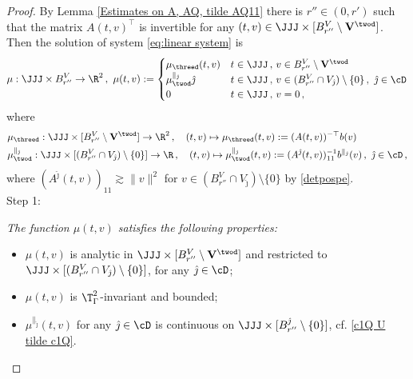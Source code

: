 \documentclass[11pt,a4paper,reqno]{article}
\numberwithin{equation}{section}
\theoremstyle{definition}
\begin{document}
    \begin{proof}
    By Lemma \ref{Estimates on A, AQ, tilde AQ11} there is $r''\in (0,r')$ such that 
  the matrix $A(t,v)^\top$ is invertible for any $(t,v)\in \JJJ\times [B_{r''}^V\setminus{\bf V}^{\twod}]$.
    Then the solution of system 
    \eqref{eq:linear system} is 
\begin{equation}\label{def:mu}
\mu:\JJJ\times B_{r''}^V\to \R^2 \, , 
\ 
            \mu(t,v):=\begin{cases}
                \mu_{\threed}(t,v) & t \in \JJJ \, , \, v\in B_{r''}^V\setminus {\bf V}^{\twod}\\
                \mu_{\twod}^{\parallel_{\hat \jmath}}\hat\jmath & t \in \JJJ \, , \, v\in (B_{r''}^V\cap V_{\hat \jmath})\setminus\{0\} \, , \ {\hat \jmath} \in \cD \\
                0 & t \in \JJJ \, , \, v=0\, , 
            \end{cases} 
        \end{equation}
where 
        \begin{align}\label{defmu3}
     &    \mu_{\threed} : \JJJ\times [B_{r''}^V\setminus {\bf V}^{\twod}] \to \R^2 \, ,\quad    (t,v) \mapsto  \mu_{\threed}(t,v):=(A(t,v))^{-\top}b(v)\,  
     \\ 
&   \mu^{\parallel_{\hat \jmath}}_{\twod}:\JJJ\times [(B_{r''}^V\cap V_{\hat \jmath})\setminus\{0\}]\to \R \, , \quad (t, v) \mapsto          \mu^{\parallel_{\hat \jmath}}_{\twod}(t,v):=(A^{\hat \jmath}(t,v))_{11}^{-1}b^{\parallel_{\hat \jmath}}(v)\, , \ {\hat \jmath} \in \cD \, , \label{defmu2}
    \end{align}  
where $ (A^{\hat \jmath}(t,v))_{11} 
\gtrsim \| v \|^2 $ for $v\in (B_{r''}^V\cap V_{\hat \jmath})\setminus\{0\}$ by  \eqref{detpospe}.
    \\[1mm]
 {\sc Step 1:} {\it The function $\mu(t,v)$ satisfies the following properties:
        \begin{itemize}
            \item[$(i)$] $\mu(t,v)$ is analytic in $\JJJ\times[B_{r''}^V\setminus {\bf V}^{\twod}]$ and restricted to   $\JJJ\times[(B_{r''}^V\cap V_{\hat \jmath})\setminus\{0\}]$, for any $ {\hat \jmath} \in \cD $; 
            \item[$(ii)$] $\mu(t,v)$ is  $\T^2_\Gamma $-invariant
            and bounded; 
            \item[$(iii)$]  $\mu^{\parallel_{\hat \jmath}}(t, v)$ for any  ${\hat \jmath} \in \cD $ is continuous on $\JJJ\times [B_{r''}^{{\hat \jmath}}\setminus\{0\}]$, cf. \eqref{c1Q U tilde c1Q}.

\end{itemize}}
\end{proof}
\end{document}
